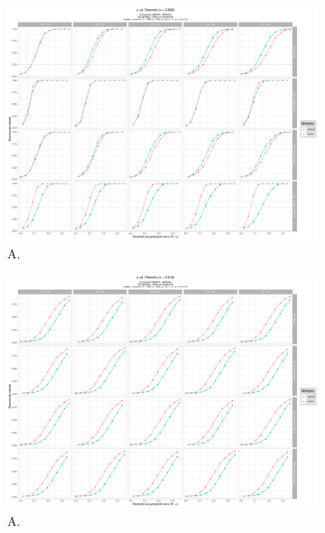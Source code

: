 \documentclass[IB,BIB]{TFUOC}%
\begin{document}
\begin{figure}[!htbp]
\hspace*{-2cm} %
\begin{subfigure}{.65\textwidth}
  \centering
  \includegraphics[width=.9\linewidth]{OBJ1c1005.pdf}
  \caption{\scriptsize{A.}}
  \label{fig:OBJ1c1005}
\end{subfigure}%
\begin{subfigure}{.65\textwidth}
\hspace*{-2.3cm} %
  \centering
  \includegraphics[width=.9\linewidth]{OBJ1c2001.pdf}
  \caption{\scriptsize{A.}}
  \label{fig:OBJ1c2001}
\end{subfigure}%
\\
\\
\begin{subfigure}{.65\textwidth}

\end{subfigure}
\end{figure}
\end{document}

